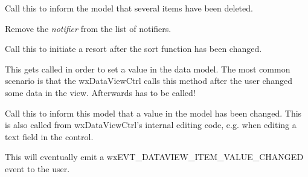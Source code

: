 Call this to inform the model that several items have been deleted.


\label{wxdataviewmodelremovenotifier}


Remove the {\it notifier} from the list of notifiers.


\label{wxdataviewmodelresort}


Call this to initiate a resort after the sort function has
been changed.


\label{wxdataviewmodelsetvalue}


This gets called in order to set a value in the data model.
The most common scenario is that the wxDataViewCtrl calls
this method after the user changed some data in the view.
Afterwards 
has to be called!


\label{wxdataviewmodelvaluechanged}


Call this to inform this model that a value in the model has
been changed. This is also called from wxDataViewCtrl's
internal editing code, e.g. when editing a text field 
in the control.

This will eventually emit a wxEVT\_DATAVIEW\_ITEM\_VALUE\_CHANGED
event to the user.

